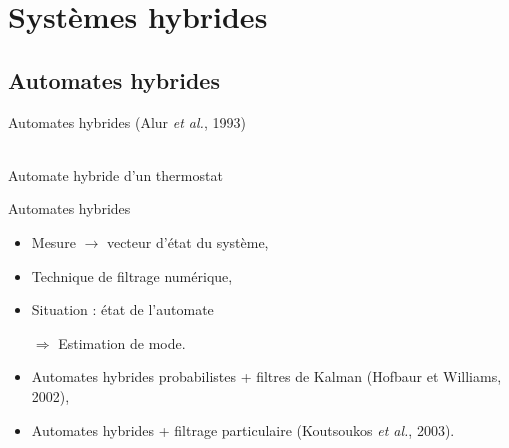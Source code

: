 \documentclass[compress]{beamer}
\begin{document}
\section{Systèmes hybrides}

\begin{frame}
\end{frame}

\subsection{Automates hybrides}
\begin{frame}{Automates hybrides (Alur {\it et al.}, 1993)}
\begin{center}
\\
\small Automate hybride d'un thermostat
\end{center}
\end{frame}

\begin{frame}{Automates hybrides}
\begin{itemize}
\item Mesure  $\rightarrow$ vecteur d'état du système,
\item Technique de filtrage numérique,
\item Situation : état de l'automate
\item[$\Longrightarrow$] Estimation de mode.
\end{itemize}
\begin{itemize}
\item Automates hybrides probabilistes + filtres de Kalman (Hofbaur et Williams, 2002),
\item Automates hybrides + filtrage particulaire (Koutsoukos {\it et al.}, 2003).
\end{itemize}
\end{frame}
\end{document}
